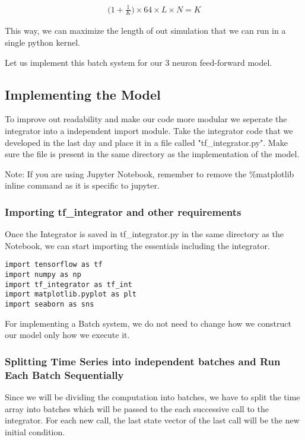 \documentclass[10pt,letterpaper]{article}
\begin{document}
\begin{eqnarray}\Big(1+\frac{1}{K}\Big)\times64\times L\times N=K\end{eqnarray}

This way, we can maximize the length of out simulation that we can run in a single python kernel.

Let us implement this batch system for our 3 neuron feed-forward model.

\subsection*{Implementing the Model}

To improve out readability and make our code more modular we seperate the integrator into a independent import module. Take the integrator code that we developed in the last day and place it in a file called "tf\_integrator.py". Make sure the file is present in the same directory as the implementation of the model. 

Note: If you are using Jupyter Notebook, remember to remove the \%matplotlib inline command as it is specific to jupyter.

\subsubsection*{Importing tf\_integrator and other requirements}

Once the Integrator is saved in tf\_integrator.py in the same directory as the Notebook, we can start importing the essentials including the integrator.

\begin{verbatim}
import tensorflow as tf
import numpy as np
import tf_integrator as tf_int
import matplotlib.pyplot as plt
import seaborn as sns
\end{verbatim}

For implementing a Batch system, we do not need to change how we construct our model only how we execute it.

\subsubsection*{Splitting Time Series into independent batches and Run Each Batch Sequentially}

Since we will be dividing the computation into batches, we have to split the time array into batches which will be passed to the each successive call to the integrator. For each new call, the last state vector of the last call will be the new initial condition. 
\end{document}
